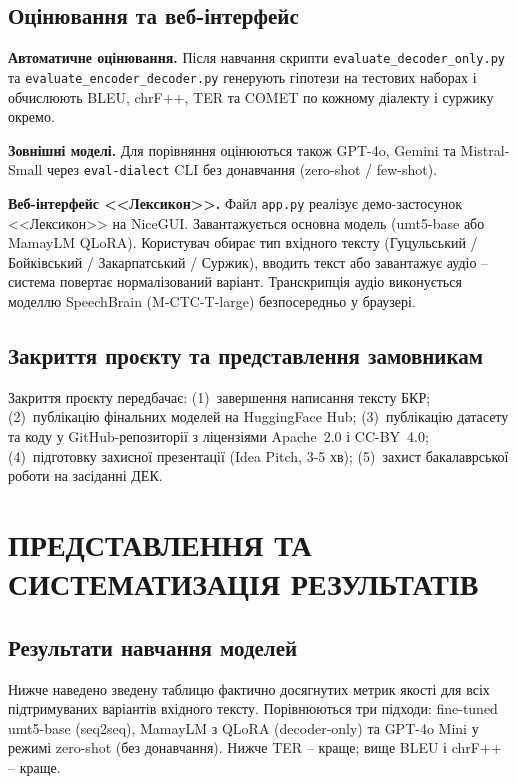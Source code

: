\documentclass[14pt]{extarticle}
\begin{document}
\subsection{Оцінювання та веб-інтерфейс}

\textbf{Автоматичне оцінювання.} Після навчання скрипти \texttt{evaluate\_decoder\_only.py} та \texttt{evaluate\_encoder\_decoder.py} генерують гіпотези на тестових наборах і обчислюють BLEU, chrF++, TER та COMET по кожному діалекту і суржику окремо.

\textbf{Зовнішні моделі.} Для порівняння оцінюються також GPT-4o, Gemini та Mistral-Small через \texttt{eval-dialect} CLI без донавчання (zero-shot / few-shot).

\textbf{Веб-інтерфейс <<Лексикон>>.} Файл \texttt{app.py} реалізує демо-застосунок <<Лексикон>> на NiceGUI. Завантажується основна модель (umt5-base або MamayLM QLoRA). Користувач обирає тип вхідного тексту (Гуцульський / Бойківський / Закарпатський / Суржик), вводить текст або завантажує аудіо -- система повертає нормалізований варіант. Транскрипція аудіо виконується моделлю SpeechBrain (M-CTC-T-large) безпосередньо у браузері.

\subsection{Закриття проєкту та представлення замовникам}

Закриття проєкту передбачає: (1)~завершення написання тексту БКР; (2)~публікацію фінальних моделей на HuggingFace Hub; (3)~публікацію датасету та коду у GitHub-репозиторії з ліцензіями Apache~2.0 і CC-BY~4.0; (4)~підготовку захисної презентації (Idea Pitch, 3-5 хв); (5)~захист бакалаврської роботи на засіданні ДЕК.

\clearpage

\section{ПРЕДСТАВЛЕННЯ ТА СИСТЕМАТИЗАЦІЯ РЕЗУЛЬТАТІВ}

\subsection{Результати навчання моделей}

Нижче наведено зведену таблицю фактично досягнутих метрик якості для всіх підтримуваних варіантів вхідного тексту. Порівнюються три підходи: fine-tuned umt5-base (seq2seq), MamayLM з QLoRA (decoder-only) та GPT-4o Mini у режимі zero-shot (без донавчання). Нижче TER -- краще; вище BLEU і chrF++ -- краще.
\end{document}
